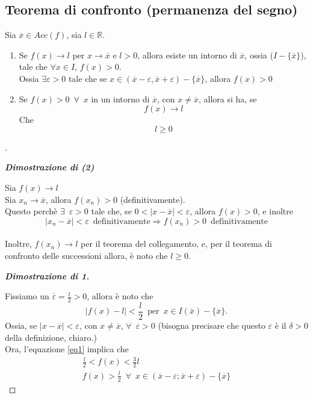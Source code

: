 \documentclass{article}
\theoremstyle{definition}
\begin{document}
\subsection{Teorema di confronto (permanenza del segno)}
Sia $\overline{x} \in Acc(f)$, sia $l \in \mathbb{R}$.
\begin{enumerate}
    \item Se $f(x) \to l$ per $x \to \overline{x}$ e $l>0$, allora esiste un intorno di $\overline{x}$, ossia ($I-\{\overline{x}\}$), tale che $\forall x \in I$, $f(x)>0$.
    \\
    Ossia $\exists \varepsilon>0$ tale che se $x \in (\overline{x}-\varepsilon, \overline{x}+\varepsilon)-\{\overline{x}\}$, allora $f(x) > 0$
    \item Se $f(x)>0 \,\,\, \forall \,\,\, x$ in un intorno di $\overline{x}$, con $x \neq \overline{x}$, allora si ha, se 
    \begin{equation}
        f(x) \to l
    \end{equation}
    Che
    \begin{equation}
        l \geqslant 0
    \end{equation}
\end{enumerate}
\begin{proof}[]
\begin{center}
    \textbf{\textit{Dimostrazione di (2)}}
\end{center}
Sia $f(x)\to l$
    \\
    Sia $x_n \to \overline{x}$, allora $f(x_n)>0$ (definitivamente).
    \\
    Questo perchè $\exists \,\,\, \varepsilon>0$ tale che, se $0< |x-\overline{x}|<\varepsilon$, allora $f(x)>0$, e inoltre
    \begin{equation}
        |x_n-\overline{x}|<\varepsilon \,\,\, \mbox{definitivamente} \Longrightarrow f(x_n)>0 \,\,\,\mbox{definitivamente}
    \end{equation}
    \\
    Inoltre, $f(x_n) \to l$ per il teorema del collegamento, e, per il teorema di confronto delle successioni allora, è noto che $l \geqslant 0$.
    \begin{center}
        \textbf{\textit{Dimostrazione di 1.}}
    \end{center}
    Fissiamo un $\overline{\varepsilon}=\frac{l}{2}>0$, allora è noto che
    \begin{equation} \label{eq1}
        |f(x)-l|<\frac{l}{2} \,\,\, \mbox{per} \,\,\, x \in I(\overline{x})-\{\overline{x}\}.
    \end{equation}
    Ossia, se $|x-\overline{x}|<\varepsilon$, con $x \neq \overline{x}$, $\forall \,\,\, \varepsilon>0$ (bisogna precisare che questo $\varepsilon$ è il $\delta>0$ della definizione, chiaro.)
    \\
    Ora, l'equazione \ref{eq1} implica che
    \begin{align*}
        \frac{l}{2}<f(x)<\frac{3}{2}l \\
        f(x)>\frac{l}{2} \,\,\, \forall \,\,\, x \in (\overline{x}-\varepsilon;\overline{x}+\varepsilon)-\{\overline{x}\}
    \end{align*}
\end{proof}
\end{document}
